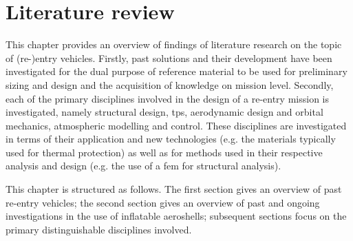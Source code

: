 \section{Literature review}\label{cha:litreview}
This chapter provides an overview of findings of literature research on the topic of (re-)entry vehicles. Firstly, past solutions and their development have been investigated for the dual purpose of reference material to be used for preliminary sizing and design and the acquisition of knowledge on mission level. Secondly, each of the primary disciplines involved in the design of a re-entry mission is investigated, namely structural design, \gls{tps}, aerodynamic design and orbital mechanics, atmospheric modelling and control. These disciplines are investigated in terms of their application and new technologies (e.g. the materials typically used for thermal protection) as well as for methods used in their respective analysis and design (e.g. the use of a \gls{fem} for structural analysis).

This chapter is structured as follows. The first section gives an overview of past re-entry vehicles; the second section gives an overview of past and ongoing investigations in the use of inflatable aeroshells; subsequent sections focus on the primary distinguishable disciplines involved.






